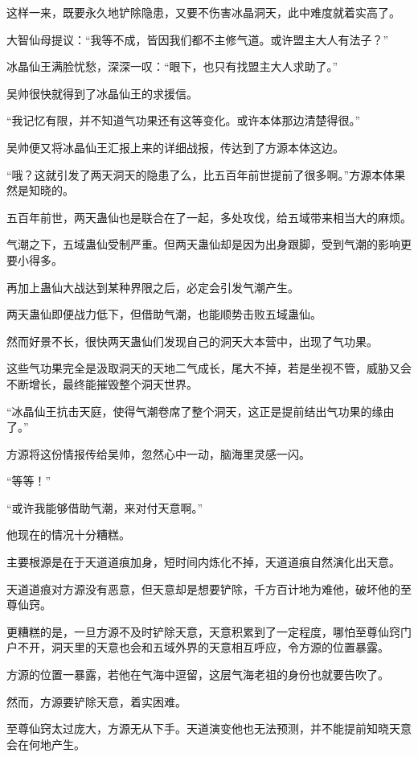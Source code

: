 \begin{this_body}
这样一来，既要永久地铲除隐患，又要不伤害冰晶洞天，此中难度就着实高了。

大智仙母提议：“我等不成，皆因我们都不主修气道。或许盟主大人有法子？”

冰晶仙王满脸忧愁，深深一叹：“眼下，也只有找盟主大人求助了。”

吴帅很快就得到了冰晶仙王的求援信。

“我记忆有限，并不知道气功果还有这等变化。或许本体那边清楚得很。”

吴帅便又将冰晶仙王汇报上来的详细战报，传达到了方源本体这边。

“哦？这就引发了两天洞天的隐患了么，比五百年前世提前了很多啊。”方源本体果然是知晓的。

五百年前世，两天蛊仙也是联合在了一起，多处攻伐，给五域带来相当大的麻烦。

气潮之下，五域蛊仙受制严重。但两天蛊仙却是因为出身跟脚，受到气潮的影响更要小得多。

再加上蛊仙大战达到某种界限之后，必定会引发气潮产生。

两天蛊仙即便战力低下，但借助气潮，也能顺势击败五域蛊仙。

然而好景不长，很快两天蛊仙们发现自己的洞天大本营中，出现了气功果。

这些气功果完全是汲取洞天的天地二气成长，尾大不掉，若是坐视不管，威胁又会不断增长，最终能摧毁整个洞天世界。

“冰晶仙王抗击天庭，使得气潮卷席了整个洞天，这正是提前结出气功果的缘由了。”

方源将这份情报传给吴帅，忽然心中一动，脑海里灵感一闪。

“等等！”

“或许我能够借助气潮，来对付天意啊。”

他现在的情况十分糟糕。

主要根源是在于天道道痕加身，短时间内炼化不掉，天道道痕自然演化出天意。

天道道痕对方源没有恶意，但天意却是想要铲除，千方百计地为难他，破坏他的至尊仙窍。

更糟糕的是，一旦方源不及时铲除天意，天意积累到了一定程度，哪怕至尊仙窍门户不开，洞天里的天意也会和五域外界的天意相互呼应，令方源的位置暴露。

方源的位置一暴露，若他在气海中逗留，这层气海老祖的身份也就要告吹了。

然而，方源要铲除天意，着实困难。

至尊仙窍太过庞大，方源无从下手。天道演变他也无法预测，并不能提前知晓天意会在何地产生。


\end{this_body}
